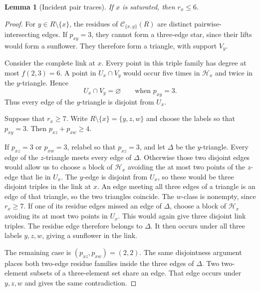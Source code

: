 \documentclass[11pt]{article}
\numberwithin{equation}{section}
\newtheorem{lemma}[lemma]{Lemma}
\theoremstyle{definition}
\theoremstyle{remark}
\newcommand{\C}{\mathcal C}
\newcommand{\Hh}{\mathcal H}
\begin{document}
\begin{lemma}[Incident pair traces]
\label{lem:f43-incident}
If $x$ is saturated, then $r_x\le6$.
\end{lemma}

\begin{proof}
For $y\in R\setminus\{x\}$, the residues of
$\C_{\{x,y\}}(R)$ are distinct pairwise-intersecting edges. If
$p_{xy}=3$, they cannot form a three-edge star, since their lifts would form
a sunflower. They therefore form a triangle, with support $V_y$.

Consider the complete link at $x$. Every point in this triple family has
degree at most $f(2,3)=6$. A point in $U_x\cap V_y$ would occur five times
in $\Hh_x$ and twice in the $y$-triangle. Hence
\begin{equation}
 U_x\cap V_y=\varnothing
 \qquad\text{when }p_{xy}=3.
 \label{eq:f43-support-disjoint}
\end{equation}
Thus every edge of the $y$-triangle is disjoint from $U_x$.

Suppose that $r_x\ge7$. Write $R\setminus\{x\}=\{y,z,w\}$ and choose the
labels so that $p_{xy}=3$. Then $p_{xz}+p_{xw}\ge4$.

If $p_{xz}=3$ or $p_{xw}=3$, relabel so that $p_{xz}=3$, and let $\Delta$
be the $y$-triangle. Every edge of the
$z$-triangle meets every edge of $\Delta$. Otherwise those two disjoint
edges would allow us to choose a block of $\Hh_x$ avoiding the at most two
points of the $z$-edge that lie in $U_x$. The $y$-edge is disjoint from
$U_x$, so these would be three disjoint triples in the link at $x$. An edge
meeting all three edges of a triangle is an edge of that triangle, so the two
triangles coincide. The $w$-class is nonempty, since $r_x\ge7$. If one of its residue edges
missed an edge of $\Delta$, choose a block of $\Hh_x$ avoiding its at most two
points in $U_x$. This would again give three disjoint link triples. The
residue edge therefore belongs to $\Delta$. It then occurs under all three
labels $y,z,w$, giving a sunflower in the link.

The remaining case is $(p_{xz},p_{xw})=(2,2)$. The same disjointness
argument places both two-edge residue families inside the three edges of
$\Delta$. Two two-element subsets of a three-element set share an edge.
That edge occurs under $y,z,w$ and gives the same contradiction.
\end{proof}
\end{document}
